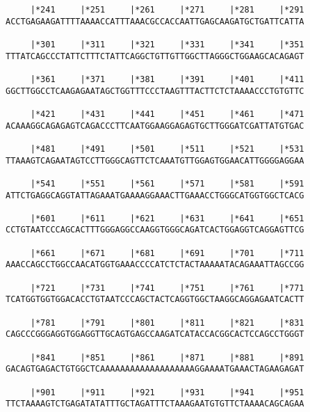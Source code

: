 \documentclass{article}
\begin{document}
\begin{Verbatim}
     |*241     |*251     |*261     |*271     |*281     |*291
ACCTGAGAAGATTTTAAAACCATTTAAACGCCACCAATTGAGCAAGATGCTGATTCATTA
                                                            
     |*301     |*311     |*321     |*331     |*341     |*351
TTTATCAGCCCTATTCTTTCTATTCAGGCTGTTGTTGGCTTAGGGCTGGAAGCACAGAGT
                                                            
     |*361     |*371     |*381     |*391     |*401     |*411
GGCTTGGCCTCAAGAGAATAGCTGGTTTCCCTAAGTTTACTTCTCTAAAACCCTGTGTTC
                                                            
     |*421     |*431     |*441     |*451     |*461     |*471
ACAAAGGCAGAGAGTCAGACCCTTCAATGGAAGGAGAGTGCTTGGGATCGATTATGTGAC
                                                            
     |*481     |*491     |*501     |*511     |*521     |*531
TTAAAGTCAGAATAGTCCTTGGGCAGTTCTCAAATGTTGGAGTGGAACATTGGGGAGGAA
                                                            
     |*541     |*551     |*561     |*571     |*581     |*591
ATTCTGAGGCAGGTATTAGAAATGAAAAGGAAACTTGAAACCTGGGCATGGTGGCTCACG
                                                            
     |*601     |*611     |*621     |*631     |*641     |*651
CCTGTAATCCCAGCACTTTGGGAGGCCAAGGTGGGCAGATCACTGGAGGTCAGGAGTTCG
                                                            
     |*661     |*671     |*681     |*691     |*701     |*711
AAACCAGCCTGGCCAACATGGTGAAACCCCATCTCTACTAAAAATACAGAAATTAGCCGG
                                                            
     |*721     |*731     |*741     |*751     |*761     |*771
TCATGGTGGTGGACACCTGTAATCCCAGCTACTCAGGTGGCTAAGGCAGGAGAATCACTT
                                                            
     |*781     |*791     |*801     |*811     |*821     |*831
CAGCCCGGGAGGTGGAGGTTGCAGTGAGCCAAGATCATACCACGGCACTCCAGCCTGGGT
                                                            
     |*841     |*851     |*861     |*871     |*881     |*891
GACAGTGAGACTGTGGCTCAAAAAAAAAAAAAAAAAAAGGAAAATGAAACTAGAAGAGAT
                                                            
     |*901     |*911     |*921     |*931     |*941     |*951
TTCTAAAAGTCTGAGATATATTTGCTAGATTTCTAAAGAATGTGTTCTAAAACAGCAGAA
                                                            

\end{Verbatim}
\end{document}
